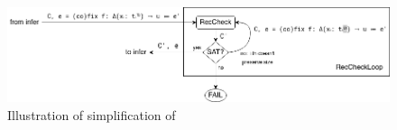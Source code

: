 \begin{figure}
\centering
\includegraphics[width=\textwidth]{images/RecCheckLoop.png}
\caption{Illustration of simplification of \RecCheckLoop}
\label{fig:RecCheckLoop}
\end{figure}